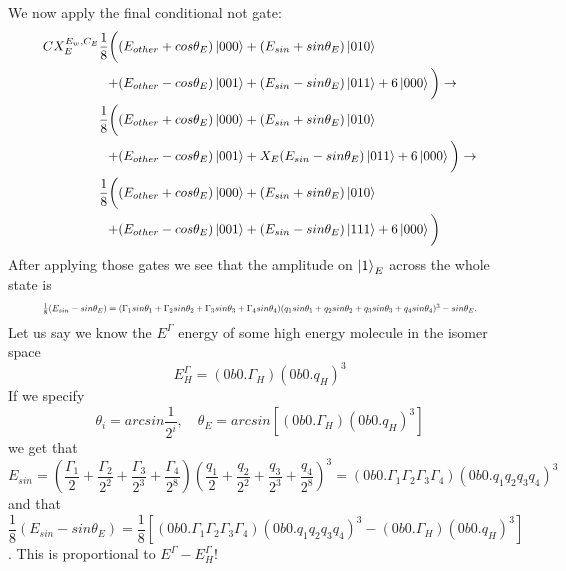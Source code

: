 \noindent
We now apply the final conditional not gate:
\begin{equation}
   \resizebox{.9\hsize}{!}{$\begin{split}
        CX_{E}^{E_w,C_E}\frac{1}{8}\bigg(
        &(E_{other}+cos\theta_E)\ket{000}+(E_{sin}+sin\theta_E)\ket{010}\\+
        &(E_{other}-cos\theta_E)\ket{001}+(E_{sin}-sin\theta_E)\ket{011}+6\ket{000}\bigg)\to\\
        \frac{1}{8}\bigg(
        &(E_{other}+cos\theta_E)\ket{000}+(E_{sin}+sin\theta_E)\ket{010}\\+
        &(E_{other}-cos\theta_E)\ket{001}+X_{E}(E_{sin}-sin\theta_E)\ket{011}+6\ket{000}\bigg)\to\\
        \frac{1}{8}\bigg(
        &(E_{other}+cos\theta_E)\ket{000}+(E_{sin}+sin\theta_E)\ket{010}\\+
        &(E_{other}-cos\theta_E)\ket{001}+(E_{sin}-sin\theta_E)\ket{111}+6\ket{000}\bigg)\\
   \end{split}$}
\end{equation}
After applying those gates we see that the amplitude on $\ket{1}_{E}$ across the whole state is 
\begin{equation*}
   \resizebox{.9\hsize}{!}{$\frac{1}{8}(E_{sin}-sin\theta_E)=(\Gamma_1sin\theta_1+\Gamma_2sin\theta_2+\Gamma_3sin\theta_3+\Gamma_4sin\theta_4)(q_1sin\theta_1+q_2sin\theta_2+q_3sin\theta_3+q_4sin\theta_4)^3-sin\theta_E.$}
\end{equation*}
Let us say we know the $E^\Gamma$ energy of some high energy molecule in the isomer space $$E^\Gamma_H = (0b0.\Gamma_H)(0b0.q_H)^3$$
If we specify 
$$\theta_i=arcsin\frac{1}{2^i},\quad\theta_E=arcsin[(0b0.\Gamma_H)(0b0.q_H)^3]$$ 
we get that $$E_{sin}=(\frac{\Gamma_1}{2}+\frac{\Gamma_2}{2^2}+\frac{\Gamma_3}{2^3}+\frac{\Gamma_4}{2^8})(\frac{q_1}{2}+\frac{q_2}{2^2}+\frac{q_3}{2^3}+\frac{q_4}{2^8})^3=(0b0.\Gamma_1\Gamma_2\Gamma_3\Gamma_4)(0b0.q_1q_2q_3q_4)^3$$ and that $$\frac{1}{8}(E_{sin}-sin\theta_E)=\frac{1}{8}[(0b0.\Gamma_1\Gamma_2\Gamma_3\Gamma_4)(0b0.q_1q_2q_3q_4)^3-(0b0.\Gamma_H)(0b0.q_H)^3]$$. This is proportional to $E^\Gamma-E^\Gamma_H$! 


